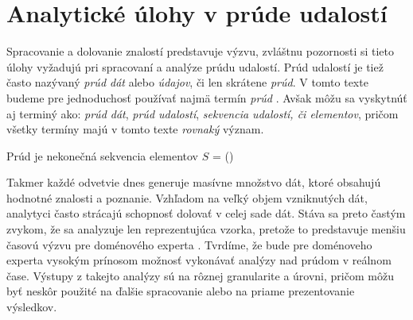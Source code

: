 \chapter{Analytické úlohy v prúde udalostí}
\label{Analytické úlohy v prúde udalostí}
Spracovanie a dolovanie znalostí predstavuje výzvu, zvláštnu pozornosti si tieto úlohy vyžadujú pri spracovaní a analýze prúdu udalostí. Prúd udalostí je tiež často nazývaný \textit{prúd dát} alebo \textit{údajov}, či len skrátene \textit{prúd}. V tomto texte budeme pre jednoduchosť používať najmä termín \textit{prúd} \citep{tran2014change}. Avšak môžu sa vyskytnúť aj terminý ako: \textit{prúd dát}, \textit{prúd udalostí}, \textit{sekvencia udalostí, či elementov}, pričom všetky termíny majú v tomto texte \textit{rovnaký} význam.\\
\begin{definition}{Prúd je nekonečná sekvencia elementov}
$S$ = {()}
\end{definition}

Takmer každé odvetvie dnes generuje masívne množstvo dát, ktoré obsahujú hodnotné znalosti a poznanie. Vzhľadom na veľký objem vzniknutých dát, analytyci často strácajú schopnosť dolovať v celej sade dát. Stáva sa preto častým zvykom, že sa analyzuje len reprezentujúca vzorka, pretože to predstavuje menšiu časovú výzvu pre doménového experta \citep{hulten2001mining}. Tvrdíme, že bude pre doménoveho experta vysokým prínosom možnosť vykonávať analýzy nad prúdom v reálnom čase. Výstupy z takejto analýzy sú na rôznej granularite a úrovni, pričom môžu byť neskôr použité na ďalšie spracovanie alebo na priame prezentovanie výsledkov.

